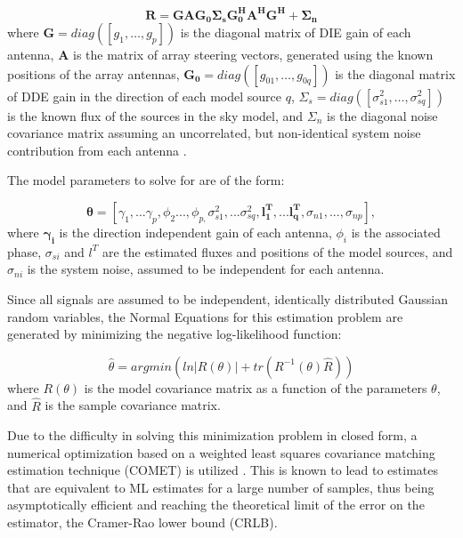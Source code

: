 \documentclass{aa}
\begin{document}
\begin{equation}
\mathbf{R=GAG_{0}\Sigma_{s}G_{0}^{H}A^{H}G^{H}+\Sigma_{n}}\label{eq:datamodel}
\end{equation}
where \textbf{$\mathbf{G=}diag(\left[g_{1},\ldots,g_{p}\right])$
}is the diagonal matrix of DIE gain of each antenna, $\mathbf{A}$
is the matrix of array steering vectors, generated using the known
positions of the array antennas, $\mathbf{G_{0}=}diag(\left[g_{01},\ldots,g_{0q}\right])$
is the diagonal matrix of DDE gain in the direction of each model
source $q$, $\Sigma_{s}=diag\left(\left[\sigma_{s1}^{2},\ldots,\sigma_{sq}^{2}\right]\right)$
is the known flux of the sources in the sky model, and $\Sigma_{n}$
is the diagonal noise covariance matrix assuming an uncorrelated,
but non-identical system noise contribution from each antenna .

The model parameters to solve for are of the form:

\begin{equation}
\mathbf{\theta}=[\gamma_{1},\ldots\gamma_{p},\phi_{2}...,\phi_{p,}\sigma_{s1}^{2},...\sigma_{sq}^{2},\mathbf{l_{1}^{T}},...\mathbf{l_{q}^{T}},\sigma_{n1},...,\sigma_{np}],\label{eq:estparam}
\end{equation}
 where $\mathbf{\gamma_{i}}$ is the direction independent gain of
each antenna, $\phi_{i}$ is the associated phase, $\sigma_{si}$
and $l^{T}$ are the estimated fluxes and positions of the model sources,
and $\sigma_{ni}$ is the system noise, assumed to be independent
for each antenna.

Since all signals are assumed to be independent, identically distributed
Gaussian random variables, the Normal Equations for this estimation
problem are generated by minimizing the negative log-likelihood function:

\begin{equation}
\hat{\theta}=argmin\left(ln|R(\theta)|+tr(R^{-1}(\theta)\widehat{R})\right)\label{eq:normeq}
\end{equation}
 where $R(\theta)$ is the model covariance matrix as a function of
the parameters $\theta$, and $\widehat{R}$ is the sample covariance
matrix.

Due to the difficulty in solving this minimization problem in closed
form, a numerical optimization based on a weighted least squares covariance
matching estimation technique (COMET) is utilized \cite{ottersten1998covariance}.
This is known to lead to estimates that are equivalent to ML estimates
for a large number of samples, thus being asymptotically efficient
and reaching the theoretical limit of the error on the estimator,
the Cramer-Rao lower bound (CRLB).
\end{document}
